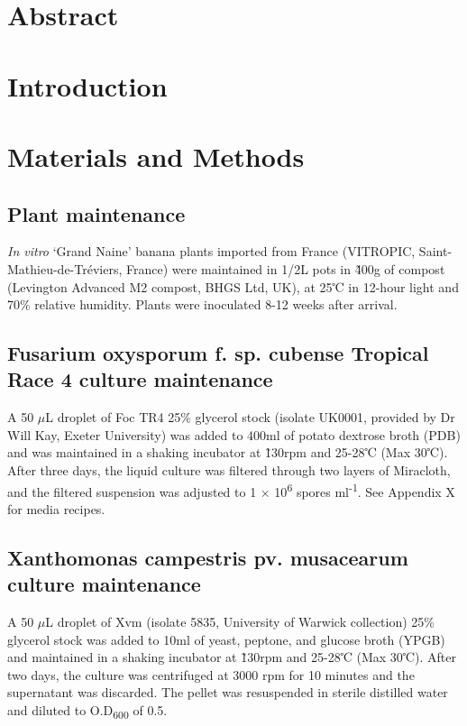 \section{Abstract}

\newpage
\section{Introduction}



 


\newpage
\section{Materials and Methods}\label{sec:Chapter4_MM}
\subsection{Plant maintenance }
\textit{In vitro }‘Grand Naine’ banana plants imported from France (VITROPIC, Saint-Mathieu-de-Tréviers, France) were maintained in 1/2L pots in \~400g of compost (Levington Advanced M2 compost, BHGS Ltd, UK), at 25℃ in 12-hour light and 70\% relative humidity. Plants were inoculated 8-12 weeks after arrival. 

\subsection{Fusarium oxysporum f. sp. cubense Tropical Race 4 culture maintenance}
A 50 \(\mu\)L droplet of Foc TR4 25\% glycerol stock (isolate UK0001, provided by Dr Will Kay, Exeter University) was added to 400ml of potato dextrose broth (PDB) and was maintained in a shaking incubator at \~130rpm and 25-28℃ (Max 30℃). After three days, the liquid culture was filtered through two layers of Miracloth, and the filtered suspension was adjusted to 1 × 10\textsuperscript{6} spores ml\textsuperscript{-1}. See Appendix X for media recipes.

\subsection{Xanthomonas campestris pv. musacearum culture maintenance}
A 50 \(\mu\)L droplet of Xvm (isolate 5835, University of Warwick collection) 25\% glycerol stock was added to 10ml of yeast, peptone, and glucose broth (YPGB) and maintained in a shaking incubator at \~130rpm and 25-28℃ (Max 30℃). After two days, the culture was centrifuged at 3000 rpm for 10 minutes and the supernatant was discarded. The pellet was resuspended in sterile distilled water and diluted to O.D\textsubscript{600} of 0.5. 

